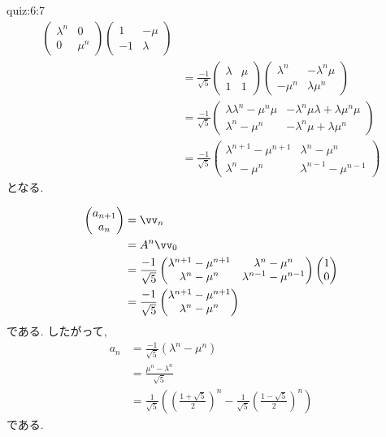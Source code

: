 \begin{answerof}{quiz:6:7}
\begin{align*}
\begin{pmatrix}
    \lambda^n&0\\
    0&\mu^n
  \end{pmatrix}
  \begin{pmatrix}
    1&-\mu\\
    -1&\lambda    
  \end{pmatrix}
\\
&=\frac{-1}{\sqrt{5}}
  \begin{pmatrix}
    \lambda&\mu\\
    1&1    
  \end{pmatrix}
  \begin{pmatrix}
    \lambda^n&-\lambda^n\mu\\
    -\mu^n&\lambda\mu^n    
  \end{pmatrix}
\\
&=\frac{-1}{\sqrt{5}}
  \begin{pmatrix}
    \lambda\lambda^n-\mu^n\mu&-\lambda^n\mu\lambda+\lambda\mu^n\mu\\
    \lambda^n-\mu^n&-\lambda^n\mu+\lambda\mu^n        
  \end{pmatrix}\\
&=\frac{-1}{\sqrt{5}}
  \begin{pmatrix}
    \lambda^{n+1}-\mu^{n+1}&\lambda^n-\mu^n\\
    \lambda^n-\mu^n&\lambda^{n-1}-\mu^{n-1}        
  \end{pmatrix}
\end{align*}
となる.

\begin{align*}
  \begin{pmatrix}a_{n+1}\\a_n\end{pmatrix}
    &=
    \vv_n\\
    &=
    A^n\vv_0\\
    &=
    \frac{-1}{\sqrt{5}}
    \begin{pmatrix}
      \lambda^{n+1}-\mu^{n+1}&\lambda^n-\mu^n\\
      \lambda^n-\mu^n&\lambda^{n-1}-\mu^{n-1}        
    \end{pmatrix}
    \begin{pmatrix}1\\0\end{pmatrix}\\
    &=
    \frac{-1}{\sqrt{5}}
    \begin{pmatrix}
      \lambda^{n+1}-\mu^{n+1}\\
      \lambda^n-\mu^n
    \end{pmatrix}
\end{align*}
である.
したがって,
\begin{align*}
  a_n&=
    \frac{-1}{\sqrt{5}}
    (\lambda^n-\mu^n)\\
    &=
    \frac{\mu^n-\lambda^n}{\sqrt{5}}
    \\
    &=\frac{1}{\sqrt{5}}\left(\left(\frac{1+\sqrt{5}}{2}\right)^n
    -\frac{1}{\sqrt{5}}\left(\frac{1-\sqrt{5}}{2}\right)^n\right)
\end{align*}
である.
\end{answerof}
